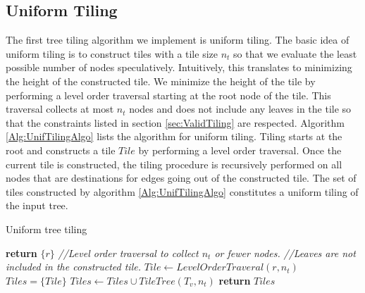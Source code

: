 \subsection{Uniform Tiling}
The first tree tiling algorithm we implement is uniform tiling. The basic idea of uniform tiling is to construct tiles
with a tile size $n_t$ so that we evaluate 
the least possible number of nodes speculatively. Intuitively, this translates to minimizing the height of the constructed tile. We minimize
the height of the tile by performing a level order traversal starting at the root node of the tile. 
This traversal collects at most $n_t$ nodes
and does not include any leaves in the tile so that the constraints listed in section \ref{sec:ValidTiling} are respected. Algorithm 
\ref{Alg:UnifTilingAlgo} lists the algorithm for uniform tiling. Tiling starts at the root and constructs a tile $Tile$ by performing
a level order traversal. Once the current tile is constructed, the tiling procedure is recursively performed on all nodes that are 
destinations for edges going out of the constructed tile. The set of tiles constructed by algorithm \ref{Alg:UnifTilingAlgo} constitutes 
a uniform tiling of the input tree.
\begin{algorithm}
  \caption{Uniform tree tiling}
  \label{Alg:UnifTilingAlgo}
  \begin{algorithmic}
              \State \textbf{return} $\{ r \}$
          \EndIf
          \State \textcolor{codegreen}{\textit{//Level order traversal to collect $n_t$ or fewer nodes. }}
          \State \textcolor{codegreen}{\textit{//Leaves are not included in the constructed tile. }}
          \State $Tile \leftarrow LevelOrderTraveral(r, n_t)$
          \State $Tiles =  \{ Tile \}$
              \State $Tiles \leftarrow Tiles \cup TileTree(T_v, n_t)$
          \EndFor
          \State \textbf{return} $Tiles$
      \EndProcedure
  \end{algorithmic}
\end{algorithm}

